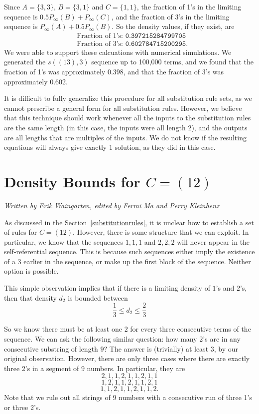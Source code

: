 \documentclass[runningheads,a4paper]{llncs}
\begin{document}
Since $A = \{3,3\}$, $B = \{3,1\}$ and $C = \{1,1\}$, the fraction of 1's in the limiting sequence is $0.5P_{\infty}(B) + P_{\infty}(C)$, and the fraction of 3's in the limiting sequence is $P_{\infty}(A) + 0.5P_{\infty}(B)$. So the density values, if they exist, are
\begin{align*}
&\text{Fraction of 1's: }\texttt{0.397215284799705}\\
&\text{Fraction of 3's: }\texttt{0.602784715200295}.
\end{align*}
We were able to support these calcuations with numerical simulations. We generated the $s((13),3)$ sequence up to 100,000 terms, and we found that the fraction of 1's was approximately $0.398$, and that the fraction of 3's was approximately 0.602.

It is difficult to fully generalize this procedure for all substitution rule sets, as we cannot prescribe a general form for all substitution rules. However, we believe that this technique should work whenever all the inputs to the substitution rules are the same length (in this case, the inputs were all length 2), and the outputs are all lengths that are multiples of the inputs. We do not know if the resulting equations will always give exactly 1 solution, as they did in this case.

\section{Density Bounds for $C = (12)$}
\label{densitybounds}
\emph{Written by Erik Waingarten, edited by Fermi Ma and Perry Kleinhenz}

As discussed in the Section~\ref{substitutionrules}, it is unclear how to establish a set of rules for $C = (1 2)$. However, there is some structure that we can exploit. In particular, we know that the sequences $1, 1, 1$ and $2, 2, 2$ will never appear in the self-referential sequence. This is because such sequences either imply the existence of a 3 earlier in the sequence, or make up the first block of the sequence. Neither option is possible.

This simple observation implies that if there is a limiting density of $1$'s and $2$'s, then that density $d_2$ is bounded between 
\[ \dfrac{1}{3} \leq d_2 \leq \dfrac{2}{3} \]

So we know there must be at least one $2$ for every three consecutive terms of the sequence. We can ask  the following similar question: how many $2$'s are in any consecutive substring of length $9$? The answer is (trivially) at least 3, by our original observation. However, there are only three cases where there are exactly three 2's in a segment of $9$ numbers. In particular, they are
\[ 2, 1, 1, 2, 1, 1 ,2 , 1, 1 \]
\[ 1, 2, 1, 1, 2, 1, 1, 2, 1 \]
\[ 1, 1, 2, 1, 1, 2, 1, 1, 2 .\]
Note that we rule out all strings of 9 numbers with a consecutive run of three 1's or three 2's. 
\end{document}
